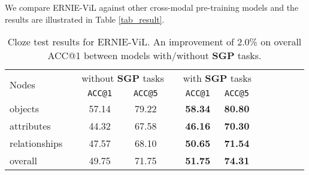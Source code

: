 \documentclass[letterpaper]{article} \usepackage{aaai21}  \usepackage{times}  \usepackage{helvet} \usepackage{courier}  \usepackage[hyphens]{url}  \usepackage{graphicx} \urlstyle{rm} \def\UrlFont{\rm}  \usepackage{natbib}  \usepackage{caption} \frenchspacing  \setlength{\pdfpagewidth}{8.5in}  \setlength{\pdfpageheight}{11in}  \usepackage{cite}
\begin{document}
We compare ERNIE-ViL against other cross-modal pre-training models and the results are illustrated in Table \ref{tab_result}.

\begin{table}[t]
  \centering
  \renewcommand{\arraystretch}{1.2}
  \tabcolsep 6.4pt
   \small
 \begin{tabular}{llllllllllll}

\toprule[0.7pt]
\multirow{2}{*}{Nodes} & &
\multicolumn{2}{c}{without \textbf{SGP} tasks}&
&
\multicolumn{2}{c}{with \textbf{SGP} tasks} &

\\
\cline{3-4}
\cline{6-7}
 & \multicolumn{1}{c}{} & \multicolumn{1}{c}{\texttt{ACC@1}} & \multicolumn{1}{c}{\texttt{ACC@5}} &
 &
 \multicolumn{1}{c}{\texttt{ACC@1}} &
 \multicolumn{1}{c}{\texttt{ACC@5}} &
 \\
\hline
objects & \multicolumn{1}{c}{} & \multicolumn{1}{c}{57.14} & \multicolumn{1}{c}{79.22}  & \multicolumn{1}{c}{} & \multicolumn{1}{c}{\textbf{58.34}} & \multicolumn{1}{c}{\textbf{80.80}} \\
attributes & \multicolumn{1}{c}{} & \multicolumn{1}{c}{44.32} & \multicolumn{1}{c}{67.58}  & \multicolumn{1}{c}{} & \multicolumn{1}{c}{\textbf{46.16}} & \multicolumn{1}{c}{\textbf{70.30}} \\
relationships & \multicolumn{1}{c}{} & \multicolumn{1}{c}{47.57} & \multicolumn{1}{c}{68.10}  & \multicolumn{1}{c}{} & \multicolumn{1}{c}{\textbf{50.65}} & \multicolumn{1}{c}{\textbf{71.54}} \\
overall & \multicolumn{1}{c}{} & \multicolumn{1}{c}{49.75} & \multicolumn{1}{c}{71.75}  & \multicolumn{1}{c}{} & \multicolumn{1}{c}{\textbf{51.75}} & \multicolumn{1}{c}{\textbf{74.31}} \\

\bottomrule[0.7pt]
\end{tabular}
\caption{Cloze test results for ERNIE-ViL. An improvement of 2.0\% on overall ACC@1 between models with/without \textbf{SGP} tasks. }
\label{tab_clone_acc}
\end{table}
\end{document}
